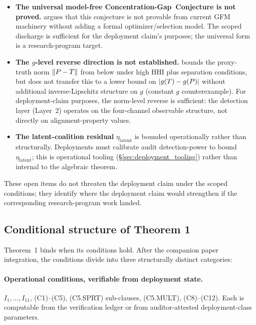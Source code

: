 \begin{itemize}
\item \textbf{The universal model-free Concentration-Gap~Conjecture
  is not proved.}  \citep[\S 7]{lasser2026foundations} argues that
  this conjecture is not provable from current GFM machinery
  without adding a formal optimizer/selection model.  The scoped
  discharge is sufficient for the deployment claim's purposes;
  the universal form is a research-program target.

\item \textbf{The $g$-level reverse direction is not established.}
  \citep[Theorem~2]{lasser2026foundations} bounds the proxy-truth
  norm $\|P - T\|$ from below under high HHI plus
  separation conditions, but does not transfer this to a lower
  bound on $|g(T) - g(P)|$ without additional
  inverse-Lipschitz structure on $g$ (constant $g$
  counterexample).  For deployment-claim purposes, the norm-level
  reverse is sufficient: the detection layer (Layer~2) operates
  on the four-channel observable structure, not directly on
  alignment-property values.

\item \textbf{The latent-coalition residual} $\eta_{\mathrm{latent}}$
  is bounded operationally rather than structurally.  Deployments
  must calibrate audit detection-power to bound
  $\eta_{\mathrm{latent}}$; this is operational tooling
  (\S\ref{sec:deployment_tooling}) rather than internal to the
  algebraic theorem.
\end{itemize}

These open items do not threaten the deployment claim under the
scoped conditions; they identify where the deployment claim would
strengthen if the corresponding research-program work landed.

\subsection{Conditional structure of Theorem 1}
\label{sec:conditional_structure}

Theorem~1 binds when its conditions hold.  After the companion
paper integration, the conditions divide into three structurally
distinct categories:

\paragraph{Operational conditions, verifiable from deployment state.}
$I_1, \ldots, I_{11}$, (C1)--(C5), (C5.SPRT) sub-clauses, (C5.MULT),
(C8)--(C12).  Each is computable from the verification ledger or
from auditor-attested deployment-class parameters.

